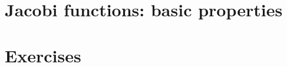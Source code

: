\section{Jacobi  functions: basic properties}
\label{app:appD-jacob-functions}
 


\section{Exercises}
\label{sec:appD-exercises}
 
